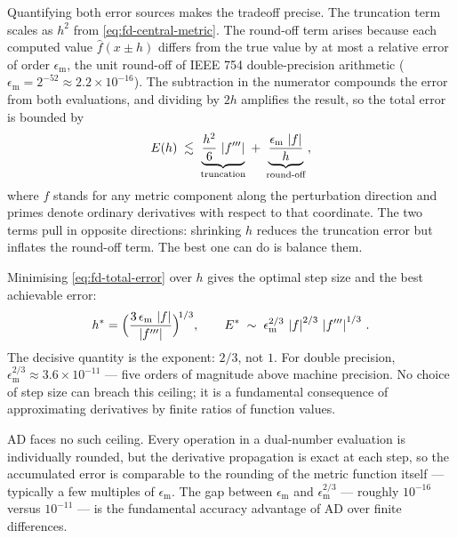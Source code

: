 Quantifying both error sources makes the tradeoff precise.
The truncation term scales as $h^2$ from
\cref{eq:fd-central-metric}.  The round-off term arises
because each computed value $\hat{f}(x \pm h)$ differs from
the true value by at most a relative error of order
$\epsilon_{\text{m}}$, the unit round-off of IEEE 754
double-precision arithmetic
($\epsilon_{\text{m}} = 2^{-52} \approx 2.2 \times 10^{-16}$).
The subtraction in the numerator compounds the error from
both evaluations, and dividing by $2h$ amplifies the result,
so the total error is bounded by
%
\begin{equation}
  E(h) \;\lesssim\;
    \underbrace{\frac{h^2}{6}\,\left\lvert f''' \right\rvert}_{\text{truncation}}
    \;+\;
    \underbrace{\frac{\epsilon_{\text{m}}\,\left\lvert f \right\rvert}{h}}_{\text{round-off}} \,,
  \label{eq:fd-total-error}
\end{equation}
%
where $f$ stands for any metric component along the
perturbation direction and primes denote ordinary
derivatives with respect to that coordinate.  The two terms
pull in opposite directions: shrinking $h$ reduces the
truncation error but inflates the round-off term.  The best
one can do is balance them.

Minimising \cref{eq:fd-total-error} over $h$ gives the
optimal step size and the best achievable error:
%
\begin{equation}
  h^*
    = \Bigl(
        \frac{3\,\epsilon_{\text{m}}\,\left\lvert f \right\rvert}{\left\lvert f''' \right\rvert}
      \Bigr)^{\!1/3} ,
  \qquad
  E^* \;\sim\; \epsilon_{\text{m}}^{2/3}\,
    \left\lvert f \right\rvert^{2/3}\,\left\lvert f''' \right\rvert^{1/3} \,.
  \label{eq:fd-optimal}
\end{equation}
%
The decisive quantity is the exponent: $2/3$, not $1$.  For
double precision,
$\epsilon_{\text{m}}^{2/3} \approx 3.6 \times 10^{-11}$ ---
five orders of magnitude above machine precision.  No choice
of step size can breach this ceiling; it is a fundamental
consequence of approximating derivatives by finite
ratios of function values.

AD faces no such ceiling.  Every operation in a dual-number
evaluation is individually rounded, but the derivative
propagation is exact at each step, so the accumulated error
is comparable to the rounding of the metric function
itself --- typically a few multiples of
$\epsilon_{\text{m}}$.  The gap between
$\epsilon_{\text{m}}$ and $\epsilon_{\text{m}}^{2/3}$ ---
roughly $10^{-16}$ versus $10^{-11}$ --- is the fundamental
accuracy advantage of AD over finite differences.

